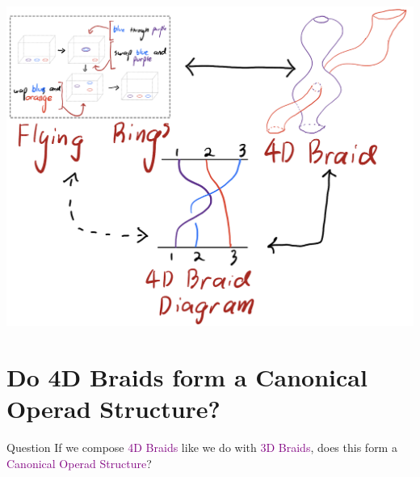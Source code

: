 \documentclass[14pt, xcolor=svgnames]{beamer}
\newcommand{\Purple}[1]{\textcolor{Purple}{#1}}
\begin{document}
\begin{frame}
    \begin{center}
    \includegraphics[width = \textwidth]{images/equivalences of welded braid representations.png}
    \end{center}
\end{frame}

\section{Do 4D Braids form a Canonical Operad Structure?}

\begin{frame}
    \begin{block}{Question}
        If we compose \Purple{4D Braids} like we do with \Purple{3D Braids}, does this form a \Purple{Canonical Operad Structure}?
    \end{block}
\end{frame}
\end{document}
